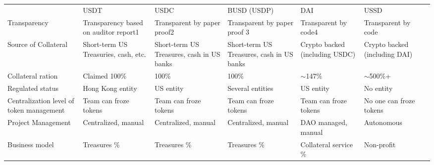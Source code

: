 \begin{table}[]
\begin{tabular}{lllllll}
                                         & USDT                                     & USDC                                      & BUSD (USDP)                               & DAI                            & USSD                          &  \\
Transparency                             & Transparency based on 			auditor report1 & Transparent by paper proof2               & Transparent by paper proof 3              & Transparent by code4           & Transparent by code           &  \\
Source of Collateral                     & Short-term US Treasuries, cash, etc.     & Short-term US Treasures, cash in US banks & Short-term US Treasures, cash in US banks & Crypto backed (including USDC) & Crypto backed (including DAI) &  \\
Collateral ration                        & Claimed 100\%                            & 100\%                                     & 100\%                                     & $\sim$147\%                    & $\sim$500\%+                  &  \\
Regulated status                         & Hong Kong entity                         & US entity                                 & Several entities                          & US entity                      & No entity                     &  \\
Centralization level of token management & Team can froze tokens                    & Team can froze tokens                     & Team can froze tokens                     & Team can froze tokens          & No one can froze tokens       &  \\
Project Management                       & Centralized, manual                      & Centralized, manual                       & Centralized, manual                       & DAO managed, manual            & Autonomous                    &  \\
Business model                           & Treasures \%                             & Treasures \%                              & Treasures \%                              & Collateral service \%          & Non-profit                    & 
\end{tabular}
\end{table}

